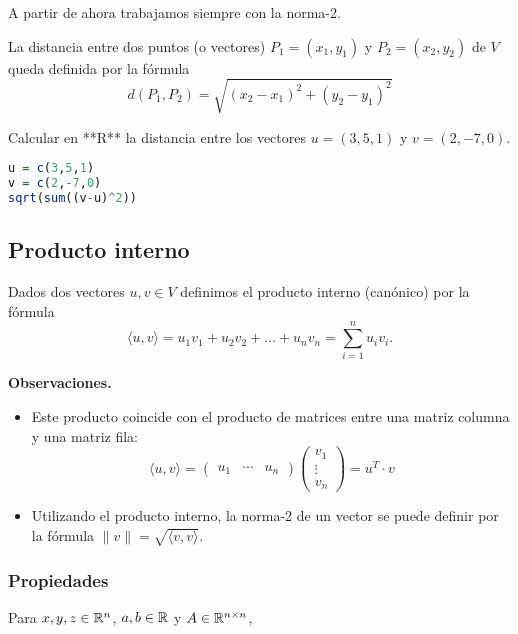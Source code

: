 A partir de ahora trabajamos siempre con la norma-2.

\begin{ejemplo}
La distancia entre dos puntos (o vectores) $P_1 = (x_1, y_1)$ y $P_2 = (x_2, y_2)$ de $V$ queda definida por la fórmula
$$
d(P_1, P_2) = \sqrt{(x_2-x_1)^2 + (y_2 - y_1)^2}
$$
\end{ejemplo}

\begin{ejemplo}
Calcular en **R** la distancia entre los vectores $u=(3,5,1)$ y $v = (2, -7, 0)$.

\begin{lstlisting}[language=R]
u = c(3,5,1)
v = c(2,-7,0)
sqrt(sum((v-u)^2))
\end{lstlisting}

\end{ejemplo}

\subsection{Producto interno}

Dados dos vectores $u, v \in V$ definimos el producto interno (canónico) por la fórmula $$
\langle u, v \rangle = u_1 v_1 + u_2 v_2 + \dots + u_n v_n = \sum_{i=1}^{n} u_iv_i.
$$

\textbf{Observaciones.}


\begin{itemize}
\item  Este producto coincide con el producto de matrices entre una matriz columna y una matriz fila: $$
    \langle u, v \rangle = \begin{pmatrix} u_1 & \cdots & u_n \end{pmatrix} \begin{pmatrix} v_1 \\ \vdots \\ v_n \end{pmatrix}=u^T \cdot v
    $$
\item  Utilizando el producto interno, la norma-2 de un vector se puede definir por la fórmula $\|v\| = \sqrt{\langle v, v\rangle}$.
\end{itemize}

\subsubsection{Propiedades}

Para $x,y,z \in \mathbb R^n$, $a,b \in \mathbb R$ y $A \in \mathbb R^{n \times n}$,

